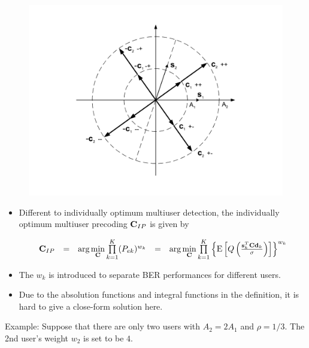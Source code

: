\documentclass[20pt,landscape]{foils}
\newcommand{\bC}{{\bf C}}
\newcommand{\bd}{{\bf d}}
\newcommand{\bs}{{\bf s}}
\begin{document}
\begin{figure}
\begin{center}
\includegraphics[width=7.0in]{JP.pdf}
\end{center}
\end{figure}

\begin{itemize}
\item Different to individually optimum multiuser detection, the
individually optimum multiuser precoding $\bC_{IP}$ is given by

$$
\begin{array}{rcccl}
\bC_{IP}&=&\mbox{arg}\min\limits_{\bC}\prod\limits_{k=1}^{K}(P_{ek})^{w_k}&=&\mbox{arg}\min\limits_{\bC}\prod\limits_{k=1}^{K}\left\{\mbox{E}\left[Q\left({\bs_k^T\bC\bd_k\over\sigma}\right)\right]\right\}^{w_k}
\end{array}\label{individually4}
$$

\item The $w_k$ is introduced to separate BER performances for
different users.

\item Due to the absolution functions and integral functions in
the definition, it is hard to give a close-form solution here.

\end{itemize}


Example: Suppose that there are only two users with $A_2=2A_1$ and
$\rho=1/3$. The 2nd user's weight $w_2$ is set to be $4$.
\end{document}
